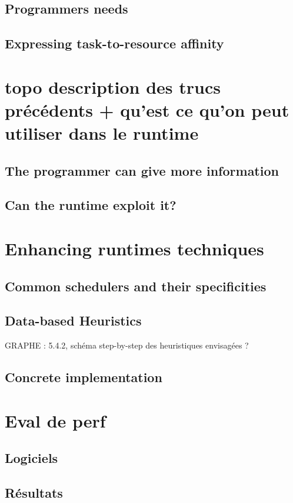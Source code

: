 \subsection{Programmers needs}
\subsection{Expressing task-to-resource affinity}

\section{topo description des trucs précédents + qu'est ce qu'on peut utiliser dans le runtime}
\subsection{The programmer can give more information}
\subsection{Can the runtime exploit it?}

\section{Enhancing runtimes techniques}
\subsection{Common schedulers and their specificities}
\subsection{Data-based Heuristics}\label{sec:contrib:ws:heuristics}
GRAPHE : 5.4.2, schéma step-by-step des heuristiques envisagées ?
\subsection{Concrete implementation}

\section{Eval de perf}
\subsection{Logiciels}
\subsection{Résultats}

